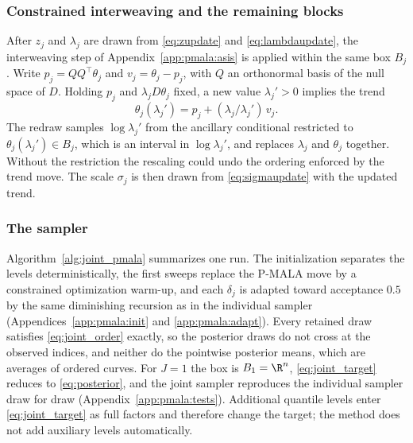 \subsubsection{Constrained interweaving and the remaining blocks}

After $z_j$ and $\lambda_j$ are drawn from \eqref{eq:zupdate} and \eqref{eq:lambdaupdate}, the interweaving step of Appendix~\ref{app:pmala:asis} is applied within the same box $B_j$. Write $p_j=QQ^\top\theta_j$ and $v_j=\theta_j-p_j$, with $Q$ an orthonormal basis of the null space of $D$. Holding $p_j$ and $\lambda_jD\theta_j$ fixed, a new value $\lambda_j'>0$ implies the trend
\begin{equation}
    \theta_j(\lambda_j')=p_j+(\lambda_j/\lambda_j')\,v_j .
    \label{eq:joint_asis_curve}
\end{equation}
The redraw samples $\log\lambda_j'$ from the ancillary conditional restricted to $\theta_j(\lambda_j')\in B_j$, which is an interval in $\log\lambda_j'$, and replaces $\lambda_j$ and $\theta_j$ together. Without the restriction the rescaling could undo the ordering enforced by the trend move. The scale $\sigma_j$ is then drawn from \eqref{eq:sigmaupdate} with the updated trend.

\subsubsection{The sampler}

Algorithm~\ref{alg:joint_pmala} summarizes one run. The initialization separates the levels deterministically, the first sweeps replace the P-MALA move by a constrained optimization warm-up, and each $\delta_j$ is adapted toward acceptance $0.5$ by the same diminishing recursion as in the individual sampler (Appendices~\ref{app:pmala:init} and \ref{app:pmala:adapt}). Every retained draw satisfies \eqref{eq:joint_order} exactly, so the posterior draws do not cross at the observed indices, and neither do the pointwise posterior means, which are averages of ordered curves. For $J=1$ the box is $B_1=\R^n$, \eqref{eq:joint_target} reduces to \eqref{eq:posterior}, and the joint sampler reproduces the individual sampler draw for draw (Appendix~\ref{app:pmala:tests}). Additional quantile levels enter \eqref{eq:joint_target} as full factors and therefore change the target; the method does not add auxiliary levels automatically.

